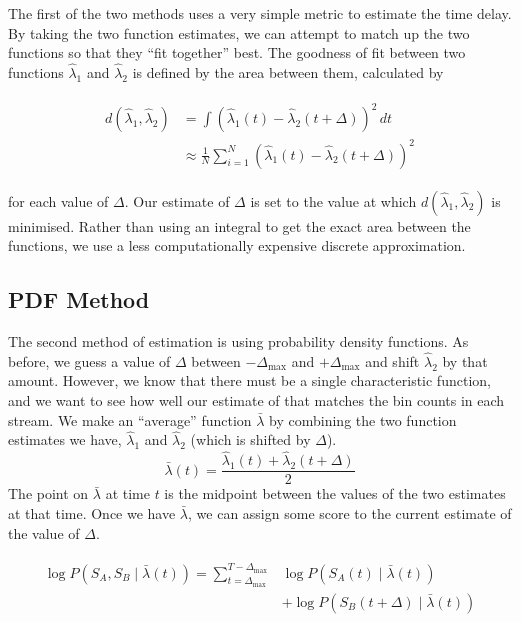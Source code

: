\documentclass[11pt]{article}
\begin{document}
   The first of the two methods uses a very simple metric to estimate the time
   delay. By taking the two function estimates, we can attempt to match up the
   two functions so that they ``fit together'' best. The goodness of fit between
   two functions $\hat{\lambda}_1$ and $\hat{\lambda}_2$ is defined by the area
   between them, calculated by

   \begin{align}
   \begin{split}
   d(\hat{\lambda}_1,\hat{\lambda}_2)&=\int(\hat{\lambda}_1(t)-\hat{\lambda}_2(t+\Delta))^2\,dt\\
   &\approx\frac{1}{N}\sum_{i=1}^N(\hat{\lambda}_1(t)-\hat{\lambda}_2(t+\Delta))^2
   \end{split}
   \end{align}

   for each value of $\Delta$. Our estimate of $\Delta$ is set to the value at
   which $d(\hat{\lambda}_1,\hat{\lambda}_2)$ is minimised. Rather than using an
   integral to get the exact area between the functions, we use a less
   computationally expensive discrete approximation.
\subsection{PDF Method}
\label{sec-4.2}

   The second method of estimation is using probability density functions. As
   before, we guess a value of $\Delta$ between $-\Delta_{\text{max}}$ and
   $+\Delta_{\text{max}}$ and shift $\hat{\lambda}_2$ by that amount. However,
   we know that there must be a single characteristic function, and we want to
   see how well our estimate of that matches the bin counts in each stream. We
   make an ``average'' function $\bar{\lambda}$ by combining the two function
   estimates we have, $\hat{\lambda}_1$ and $\hat{\lambda}_2$ (which is shifted
   by $\Delta$).
   \begin{equation}
   \bar{\lambda}(t)=\frac{\hat{\lambda}_1(t)+\hat{\lambda}_2(t+\Delta)}{2}
   \end{equation}
   The point on $\bar{\lambda}$ at time $t$ is the midpoint between the values of
   the two estimates at that time. Once we have $\bar{\lambda}$, we can assign some
   score to the current estimate of the value of $\Delta$.

   \begin{align}
   \begin{split}
   \log P(S_A,S_B\mid\bar{\lambda}(t))=\sum_{t=\Delta_{\text{max}}}^{T-\Delta_{\text{max}}}&\log P(S_A(t)\mid \bar{\lambda}(t))\\
   &+ \log P(S_B(t+\Delta)\mid \bar{\lambda}(t))\\
   \label{eq:cfuncprob}
   \end{split}
   \end{align}
   
\end{document}
